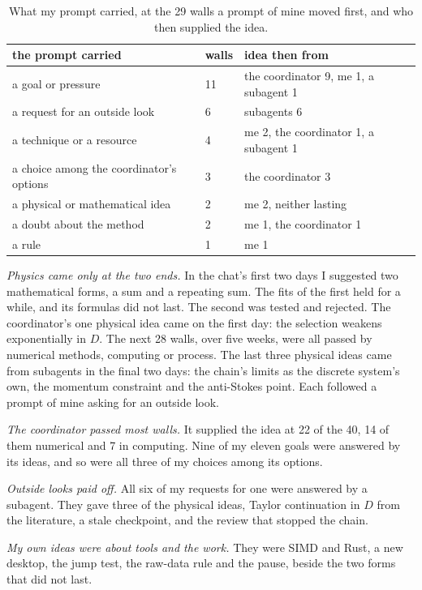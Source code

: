 \documentclass[aps,prd,onecolumn,superscriptaddress,nofootinbib,10pt]{revtex4-2}
\begin{document}
\begin{table}[h]
\caption{What my prompt carried, at the 29 walls a prompt of mine moved first, and who then supplied the idea.}
\label{tab:carried}
\small
\begin{tabular}{L{5.8cm}C{1.4cm}L{6.4cm}}
\toprule
the prompt carried & walls & idea then from\\
\midrule
a goal or pressure & 11 & the coordinator 9, me 1, a subagent 1\\
a request for an outside look & 6 & subagents 6\\
a technique or a resource & 4 & me 2, the coordinator 1, a subagent 1\\
a choice among the coordinator's options & 3 & the coordinator 3\\
a physical or mathematical idea & 2 & me 2, neither lasting\\
a doubt about the method & 2 & me 1, the coordinator 1\\
a rule & 1 & me 1\\
\bottomrule
\end{tabular}
\end{table}

\emph{Physics came only at the two ends.} In the chat's first two days I suggested two mathematical forms, a sum and a
repeating sum. The fits of the first held for a while, and its formulas did not last. The second was tested and
rejected. The coordinator's one physical idea came on the first day: the selection weakens exponentially in $D$. The next
28 walls, over five weeks, were all passed by numerical methods, computing or process. The last three physical ideas
came from subagents in the final two days: the chain's limits as the discrete system's own, the momentum constraint and
the anti-Stokes point. Each followed a prompt of mine asking for an outside look.

\emph{The coordinator passed most walls.} It supplied the idea at 22 of the 40, 14 of them numerical and 7 in computing.
Nine of my eleven goals were answered by its ideas, and so were all three of my choices among its options.

\emph{Outside looks paid off.} All six of my requests for one were answered by a subagent. They gave three of the
physical ideas, Taylor continuation in $D$ from the literature, a stale checkpoint, and the review that stopped the chain.

\emph{My own ideas were about tools and the work.} They were SIMD and Rust, a new desktop, the jump test, the raw-data
rule and the pause, beside the two forms that did not last.
\end{document}
